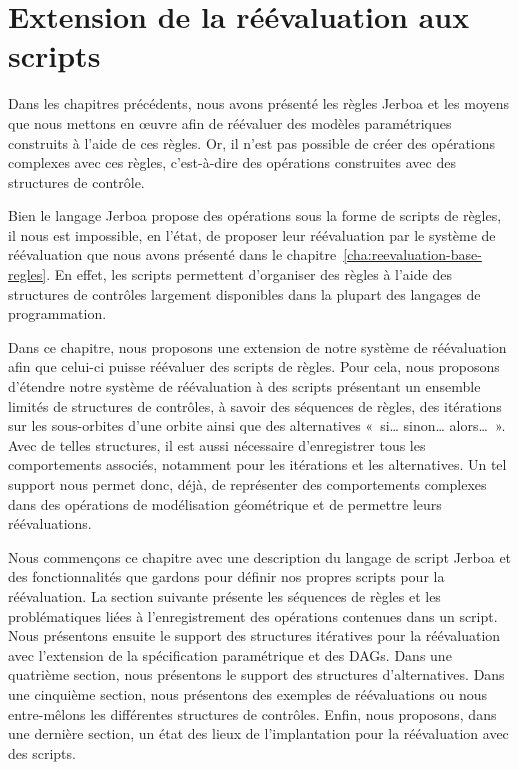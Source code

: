 \chapter{Extension de la réévaluation aux scripts}
\label{cha:extension-scripts}

Dans les chapitres précédents, nous avons présenté les règles Jerboa et les
moyens que nous mettons en \oe uvre afin de réévaluer des modèles paramétriques
construits à l'aide de ces règles. %
Or, il n'est pas possible de créer des opérations complexes avec ces règles,
c'est-à-dire des opérations construites avec des structures de contrôle. %

Bien le langage Jerboa propose des opérations sous la forme de scripts de
règles, il nous est impossible, en l'état, de proposer leur réévaluation par le
système de réévaluation que nous avons présenté dans le
chapitre~\ref{cha:reevaluation-base-regles}. %
En effet, les scripts permettent d'organiser des règles à l'aide des structures
de contrôles largement disponibles dans la plupart des langages de
programmation. %

Dans ce chapitre, nous proposons une extension de notre système de réévaluation
afin que celui-ci puisse réévaluer des scripts de règles. %
Pour cela, nous proposons d'étendre notre système de réévaluation à des scripts
présentant un ensemble limités de structures de contrôles, à savoir des
séquences de règles, des itérations sur les sous-orbites d'une orbite ainsi que
des alternatives «~si… sinon… alors…~». %
Avec de telles structures, il est aussi nécessaire d'enregistrer tous les
comportements associés, notamment pour les itérations et les alternatives. %
Un tel support nous permet donc, déjà, de représenter des comportements
complexes dans des opérations de modélisation géométrique et de permettre leurs
réévaluations. %

Nous commençons ce chapitre avec une description du langage de script Jerboa et
des fonctionnalités que gardons pour définir nos propres scripts pour la
réévaluation. %
La section suivante présente les séquences de règles et les problématiques liées
à l'enregistrement des opérations contenues dans un script. %
Nous présentons ensuite le support des structures itératives pour la
réévaluation avec l'extension de la spécification paramétrique et des DAGs. %
Dans une quatrième section, nous présentons le support des structures
d'alternatives. %
Dans une cinquième section, nous présentons des exemples de réévaluations ou
nous entre-mêlons les différentes structures de contrôles. %
Enfin, nous proposons, dans une dernière section, un état des lieux de
l'implantation pour la réévaluation avec des scripts. %


